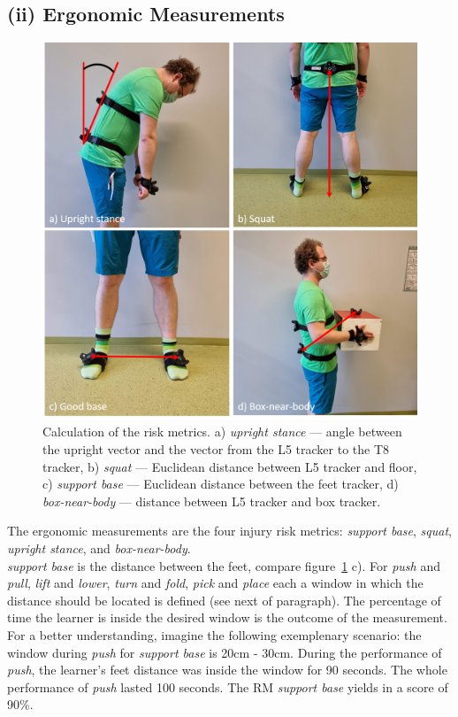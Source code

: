 \subsection{(ii) Ergonomic Measurements}
\label{sec:ergonomicMeasurements}
\begin{figure}[H]
	\centering
	\includegraphics[width=\textwidth]{figures/riskMeasurements.png}
	\caption[Risk metrics calculation]{Calculation of the risk metrics. a) \textit{upright stance} --- angle between the upright vector and the vector from the L5 tracker to the T8 tracker, b) \textit{squat} --- Euclidean distance between L5 tracker and floor, c) \textit{support base} --- Euclidean distance between the feet tracker, d) \textit{box-near-body} --- distance between L5 tracker and box tracker.}
	\label{fig:rmCalc}
\end{figure}
The ergonomic measurements are the four injury risk metrics: \textit{support base}, \textit{squat}, \textit{upright stance}, and \textit{box-near-body}.\\
\textit{support base} is the distance between the feet, compare figure~\ref{fig:rmCalc} c). For \textit{push} and \textit{pull}, \textit{lift} and \textit{lower}, \textit{turn} and \textit{fold}, \textit{pick} and \textit{place} each a window in which the distance should be located is defined (see next of paragraph). The percentage of time the learner is inside the desired window is the outcome of the measurement. For a better understanding, imagine the following exemplenary scenario: the window during \textit{push} for \textit{support base} is 20cm - 30cm. During the performance of \textit{push}, the learner's feet distance was inside the window for 90 seconds. The whole performance of \textit{push} lasted 100 seconds. The RM \textit{support base} yields in a score of 90\%.\\

